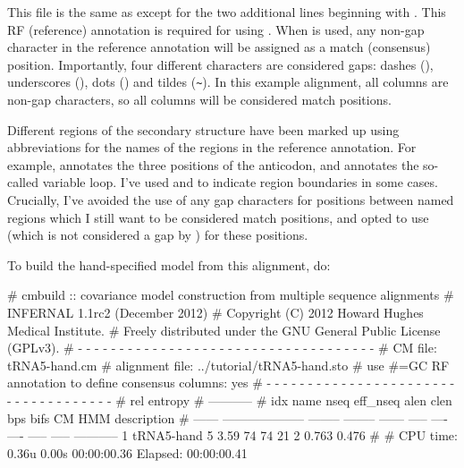This file is the same as  except for the two
additional lines beginning with . This RF (reference)
annotation is required for using . When 
is used, any non-gap character in the reference annotation will be
assigned as a match (consensus) position. Importantly, four different
characters are considered gaps: dashes (\otext{-}), underscores
(\otext{\_}), dots () and tildes (\verb+~+). In this example
alignment, all columns are non-gap characters, so all columns will be
considered match positions.

Different regions of the secondary structure have been marked up using
abbreviations for the names of the regions in the reference
annotation. For example,  annotates the three positions of
the anticodon, and \otext{[vlp]} annotates the so-called variable
loop. I've used \otext{[} and \otext{]} to indicate region boundaries
in some cases. Crucially, I've avoided the use of any gap characters
for positions between named regions which I still want to be
considered match positions, and opted to use \otext{=} (which is not
considered a gap by ) for these positions.

To build the hand-specified model from this alignment, do:


\begin{sreoutput}
# cmbuild :: covariance model construction from multiple sequence alignments
# INFERNAL 1.1rc2 (December 2012)
# Copyright (C) 2012 Howard Hughes Medical Institute.
# Freely distributed under the GNU General Public License (GPLv3).
# - - - - - - - - - - - - - - - - - - - - - - - - - - - - - - - - - - - -
# CM file:                                            tRNA5-hand.cm
# alignment file:                                     ../tutorial/tRNA5-hand.sto
# use #=GC RF annotation to define consensus columns: yes
# - - - - - - - - - - - - - - - - - - - - - - - - - - - - - - - - - - - -
#                                                                      rel entropy
#                                                                      -----------
# idx    name                     nseq eff_nseq   alen  clen  bps bifs    CM   HMM description
# ------ -------------------- -------- -------- ------ ----- ---- ---- ----- ----- -----------
       1 tRNA5-hand                  5     3.59     74    74   21    2 0.763 0.476 
#
# CPU time: 0.36u 0.00s 00:00:00.36 Elapsed: 00:00:00.41
\end{sreoutput}

